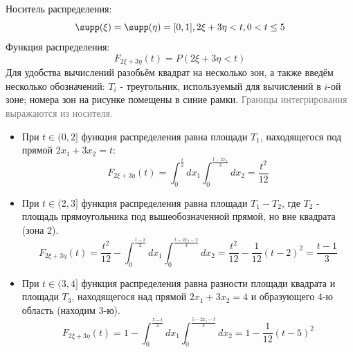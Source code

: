 \begin{enumerate}
	Носитель распределения:
	\[ \supp (\xi) = \supp (\eta) = [0,1], 2\xi + 3 \eta < t, 0 < t \le 5 \]
	Функция распределения:
	\[ F_{2 \xi + 3 \eta} (t) = P(2 \xi + 3 \eta < t) \]
	Для удобства вычислений разобьём квадрат на несколько зон, а также введём несколько обозначений: $T_i$ - треугольник, используемый для вычислений в $i$-ой зоне; номера зон на рисунке помещены в синие рамки. \textcolor{Grey}{Границы интегрирования выражаются из носителя.}
	\begin{itemize}
		\item При $t \in (0, 2]$ функция распределения равна площади $T_1$, находящегося под прямой $2x_1+3x_2=t$:
		\[ F_{2\xi + 3\eta} (t) = \int_{0}^{\frac{t}{2}} dx_1 \int_{0}^{\frac{t-2x_1}{3}}dx_2 = \frac{t^2}{12} \]
		\item При $t \in (2, 3]$ функция распределения равна площади $T_1 - T_2$, где $T_2$ - площадь прямоугольника под вышеобозначенной прямой, но вне квадрата (зона 2).
		\[ F_{2\xi + 3\eta} (t) = \frac{t^2}{12} - \int_{0}^{\frac{t-2}{2}}dx_1 \int_{0}^{\frac{t-2x_1-2}{3}} dx_2 = \frac{t^2}{12} - \frac{1}{12} (t - 2)^2 = \frac{t-1}{3} \]
		\item При $t \in (3, 4]$ функция распределения равна разности площади квадрата и площади $T_3$, находящегося над прямой $2x_1 + 3x_2 = 4$ и образующего 4-ю область (находим 3-ю).
		\[ F_{2\xi + 3\eta} (t) = 1 - \int_{0}^{\frac{5-t}{2}}dx_1 \int_{0}^{\frac{5-2x_1-t}{3}} dx_2 = 1 - \frac{1}{12} (t - 5)^2 \]
	\end{itemize}
	\begin{figure}[H]

\end{figure}
\end{enumerate}
